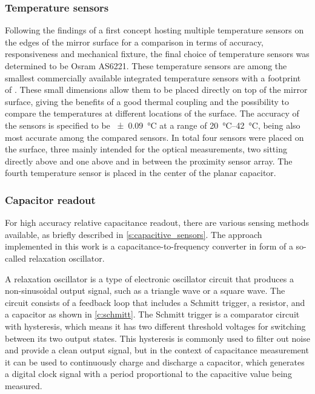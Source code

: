 \subsubsection{Temperature sensors}
Following the findings of a first concept hosting multiple temperature sensors on the edges of the mirror surface for a comparison in terms of accuracy, responsiveness and mechanical fixture, the final choice of temperature sensors was determined to be Osram AS6221. These temperature sensors are among the smallest commercially available integrated temperature sensors with a footprint of . These small dimensions allow them to be placed directly on top of the mirror surface, giving the benefits of a good thermal coupling and the possibility to compare the temperatures at different locations of the surface. The accuracy of the sensors is specified to be \qty{\pm 0.09}{\celsius} at a range of \qtyrange{20}{42}{\celsius}, being also most accurate among the compared sensors. In total four sensors were placed on the surface, three mainly intended for the optical measurements, two sitting directly above and one above and in between the proximity sensor array. The fourth temperature sensor is placed in the center of the planar capacitor.

\subsubsection{Capacitor readout}
For high accuracy relative capacitance readout, there are various sensing methods available, as briefly described in \cref{s:capacitive_sensors}. The approach implemented in this work is a capacitance-to-frequency converter in form of a so-called relaxation oscillator.

A relaxation oscillator is a type of electronic oscillator circuit that produces a non-sinusoidal output signal, such as a triangle wave or a square wave. The circuit consists of a feedback loop that includes a Schmitt trigger, a resistor, and a capacitor as shown in \cref{c:schmitt}. The Schmitt trigger is a comparator circuit with hysteresis, which means it has two different threshold voltages for switching between its two output states. This hysteresis is commonly used to filter out noise and provide a clean output signal, but in the context of capacitance measurement it can be used to continuously charge and discharge a capacitor, which generates a digital clock signal with a period proportional to the capacitive value being measured.

